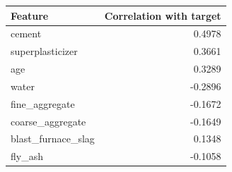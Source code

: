 \begin{tabular}{lr}
\toprule
Feature & Correlation with target \\
\midrule
cement & 0.4978 \\
superplasticizer & 0.3661 \\
age & 0.3289 \\
water & -0.2896 \\
fine\_aggregate & -0.1672 \\
coarse\_aggregate & -0.1649 \\
blast\_furnace\_slag & 0.1348 \\
fly\_ash & -0.1058 \\
\bottomrule
\end{tabular}